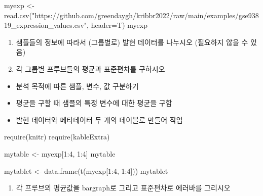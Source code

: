 \documentclass[
]{book}
\newenvironment{Shaded}{\begin{snugshade}}{\end{snugshade}}
\newcommand{\AttributeTok}[1]{\textcolor[rgb]{0.77,0.63,0.00}{#1}}
\newcommand{\DecValTok}[1]{\textcolor[rgb]{0.00,0.00,0.81}{#1}}
\newcommand{\FunctionTok}[1]{\textcolor[rgb]{0.00,0.00,0.00}{#1}}
\newcommand{\NormalTok}[1]{#1}
\newcommand{\OtherTok}[1]{\textcolor[rgb]{0.56,0.35,0.01}{#1}}
\newcommand{\SpecialCharTok}[1]{\textcolor[rgb]{0.00,0.00,0.00}{#1}}
\newcommand{\StringTok}[1]{\textcolor[rgb]{0.31,0.60,0.02}{#1}}
\providecommand{\tightlist}{%
  \setlength{\itemsep}{0pt}\setlength{\parskip}{0pt}}
\begin{document}
\begin{Shaded}
\begin{Highlighting}[]
\NormalTok{myexp }\OtherTok{\textless{}{-}} \FunctionTok{read.csv}\NormalTok{(}\StringTok{"https://github.com/greendaygh/kribbr2022/raw/main/examples/gse93819\_expression\_values.csv"}\NormalTok{, }\AttributeTok{header=}\NormalTok{T)}
\NormalTok{myexp}
\end{Highlighting}
\end{Shaded}

\begin{enumerate}
\def\labelenumi{\arabic{enumi}.}
\setcounter{enumi}{1}
\item
  샘플들의 정보에 따라서 (그룹별로) 발현 데이터를 나누시오 (필요하지 않을 수 있음)
\item
  각 그룹별 프루브들의 평균과 표준편차를 구하시오
\end{enumerate}

\begin{itemize}
\tightlist
\item
  분석 목적에 따른 샘플, 변수, 값 구분하기
\item
  평균을 구할 때 샘플의 특정 변수에 대한 평균을 구함
\item
  발현 데이터와 메타데이터 두 개의 테이블로 만들어 작업
\end{itemize}

\begin{Shaded}
\begin{Highlighting}[]
\FunctionTok{require}\NormalTok{(knitr)}
\FunctionTok{require}\NormalTok{(kableExtra)}

\NormalTok{mytable }\OtherTok{\textless{}{-}}\NormalTok{ myexp[}\DecValTok{1}\SpecialCharTok{:}\DecValTok{4}\NormalTok{, }\DecValTok{1}\SpecialCharTok{:}\DecValTok{4}\NormalTok{]}
\NormalTok{mytable }

\NormalTok{mytablet }\OtherTok{\textless{}{-}} \FunctionTok{data.frame}\NormalTok{(}\FunctionTok{t}\NormalTok{(myexp[}\DecValTok{1}\SpecialCharTok{:}\DecValTok{4}\NormalTok{, }\DecValTok{1}\SpecialCharTok{:}\DecValTok{4}\NormalTok{]))}
\NormalTok{mytablet }
\end{Highlighting}
\end{Shaded}

\begin{enumerate}
\def\labelenumi{\arabic{enumi}.}
\setcounter{enumi}{3}
\tightlist
\item
  각 프루브의 평균값을 bargraph로 그리고 표준편차로 에러바를 그리시오
\end{enumerate}
\end{document}
